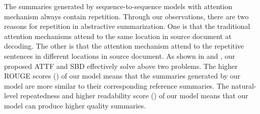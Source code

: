The summaries generated by sequence-to-sequence models with attention mechanism always contain repetition.  
Through our observations, there are two reasons for repetition in abstractive summarization.
One is that the traditional attention mechanisms attend to the same location in source document at decoding.
The other is that the attention mechanism attend to the repetitive sentences in different locations in source document. 
As shown in  and ,
our proposed ATTF and SBD effectively solve above two problems.  
The higher ROUGE scores () of our model means that
the summaries generated by our model are more similar to their corresponding reference summaries.
The natural-level repeatedness and higher readability score () of our model means 
that our model can produce higher quality summaries.



